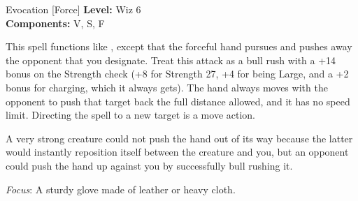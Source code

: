 {Evocation [Force]}
{
	\textbf{Level:}
	Wiz 6\\
	\textbf{Components:}
	V, S, F\\
}
{
	This spell functions like , except that the forceful hand pursues and pushes away the opponent that you designate. Treat this attack as a bull rush with a +14 bonus on the Strength check (+8 for Strength 27, +4 for being Large, and a +2 bonus for charging, which it always gets). The hand always moves with the opponent to push that target back the full distance allowed, and it has no speed limit. Directing the spell to a new target is a move action.

	A very strong creature could not push the hand out of its way because the latter would instantly reposition itself between the creature and you, but an opponent could push the hand up against you by successfully bull rushing it.

	\textit{Focus}:
	A sturdy glove made of leather or heavy cloth.

}
